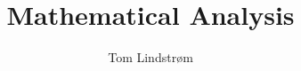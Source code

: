 \documentclass[a4paper]{memoir}
\title{Mathematical Analysis}
\author{Tom Lindstr{\o}m\hfill\the\year}
\begin{document}
\mnfrontpage
\end{document}
